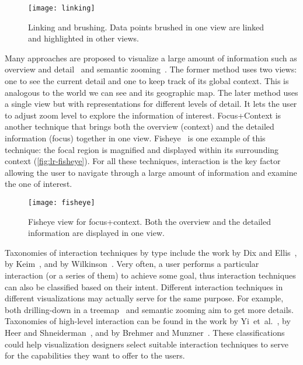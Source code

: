 \begin{figure}[!htb]
	\centering
	\texttt{[image: linking]}
	\caption[Linking and brushing]{Linking and brushing. Data points brushed in one view are linked and highlighted in other views.}
	\label{fig:lr-linking}
\end{figure}

Many approaches are proposed to visualize a large amount of information such as overview and detail~\cite{Cockburn2008} and semantic zooming~\cite{Perlin1993}. The former method uses two views: one to see the current detail and one to keep track of its global context. This is analogous to the world we can see and its geographic map. The later method uses a single view but with representations for different levels of detail. It lets the user to adjust zoom level to explore the information of interest. Focus+Context is another technique that brings both the overview (context) and the detailed information (focus) together in one view. Fisheye~\cite{Furnas1986,Furnas2006} is one example of this technique: the focal region is magnified and displayed within its surrounding context (\autoref{fig:lr-fisheye}). For all these techniques, interaction is the key factor allowing the user to navigate through a large amount of information and examine the one of interest.

\begin{figure}[!htb]
	\centering	
	\texttt{[image: fisheye]}
	\caption[Fisheye view for focus+context]{Fisheye view for focus+context. Both the overview and the detailed information are displayed in one view.} 
\label{fig:lr-fisheye}
\end{figure}

Taxonomies of interaction techniques by type include the work by Dix and Ellis~\cite{Dix1998}, by Keim~\cite{Keim2002}, and by Wilkinson~\cite{Wilkinson2005}. Very often, a user performs a particular interaction (or a series of them) to achieve some goal, thus interaction techniques can also be classified based on their intent. Different interaction techniques in different visualizations may actually serve for the same purpose. For example, both drilling-down in a treemap~\cite{Shneiderman1992} and semantic zooming aim to get more details. Taxonomies of high-level interaction can be found in the work by Yi~et~al.~\cite{Yi2007}, by Heer and Shneiderman~\cite{Heer2012}, and by Brehmer and Munzner~\cite{Brehmer2013}. These classifications could help visualization designers select suitable interaction techniques to serve for the capabilities they want to offer to the users.

